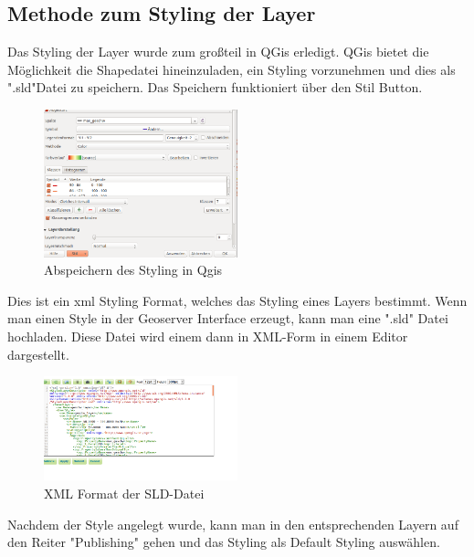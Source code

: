 \subsection{Methode zum Styling der Layer}
Das Styling der Layer wurde zum großteil in QGis erledigt. QGis bietet die Möglichkeit die Shapedatei hineinzuladen, ein Styling vorzunehmen und dies als ".sld"Datei zu speichern. Das Speichern funktioniert über den Stil Button.
\begin{figure}[h]
\centering
	\includegraphics[width=0.5\textwidth]{images/save_styling.png}
	\caption{Abspeichern des Styling in Qgis}
\end{figure}
Dies ist ein xml Styling Format, welches das Styling eines  Layers bestimmt.
Wenn man einen Style in der Geoserver Interface erzeugt, kann man eine ".sld" Datei hochladen. Diese Datei wird einem dann in XML-Form in einem Editor dargestellt.
\begin{figure}[h]
\centering
	\includegraphics[width=0.5\textwidth]{images/StyleXML.png}
	\caption{XML Format der SLD-Datei}
\end{figure}
Nachdem der Style angelegt wurde, kann man in den entsprechenden Layern auf den Reiter "Publishing" gehen und das Styling als Default Styling auswählen.
\pagebreak
